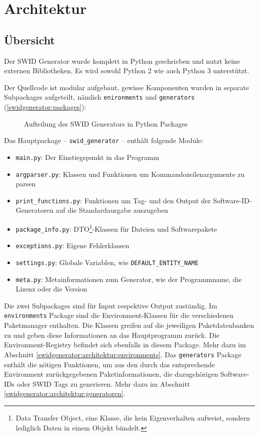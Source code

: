 \section{Architektur}

\subsection{Übersicht}

Der SWID Generator wurde komplett in Python geschrieben und nutzt keine externen
Bibliotheken. Es wird sowohl Python 2 wie auch Python 3 unterstützt.

Der Quellcode ist modular aufgebaut, gewisse Komponenten wurden in separate
Subpackages aufgeteilt, nämlich \texttt{enironments} und \texttt{generators} (\autoref{swidgenerator:packages}):

\begin{figure}[H]
	\centering
	
	\caption{Aufteilung des SWID Generators in Python Packages}
	\label{swidgenerator:packages}
\end{figure}

Das Hauptpackage -- \texttt{swid\_generator} -- enthält folgende Module:

\begin{itemize}
	\item \texttt{main.py}: Der Einstiegspunkt in das Programm
	\item \texttt{argparser.py}: Klassen und Funktionen um
		Kommandozeilenargumente zu parsen
	\item \texttt{print\_functions.py}: Funktionen um Tag- und den Output der
		Software-ID-Generatoren auf die Standardausgabe auszugeben
	\item \texttt{package\_info.py}: DTO\footnote{Data Transfer Object, eine
		Klasse, die kein Eigenverhalten aufweist, sondern lediglich Daten in
		einem Objekt bündelt.}-Klassen für Dateien und Softwarepakete
	\item \texttt{exceptions.py}: Eigene Fehlerklassen
	\item \texttt{settings.py}: Globale Variablen, wie \zb
		\texttt{DEFAULT\_ENTITY\_NAME}
	\item \texttt{meta.py}: Metainformationen zum Generator, wie \zb der
		Programmname, die Lizenz oder die Version
\end{itemize}

Die zwei Subpackages sind für Input respektive Output zuständig. Im
\texttt{environments} Package sind die Environment-Klassen für die verschiedenen
Paketmanager enthalten. Die Klassen greifen auf die jeweiligen Paketdatenbanken
zu und geben diese Informationen an das Hauptprogramm zurück. Die
Environment-Registry befindet sich ebenfalls in diesem Package. Mehr dazu im
Abschnitt \ref{swidgenerator:architektur:environments}. Das \texttt{generators}
Package enthält die nötigen Funktionen, um aus den durch das entsprechende
Environment zurückgegebenen Paketinformationen, die dazugehörigen Software-IDs
oder SWID Tags zu generieren. Mehr dazu im Abschnitt
\ref{swidgenerator:architektur:generatoren}.

